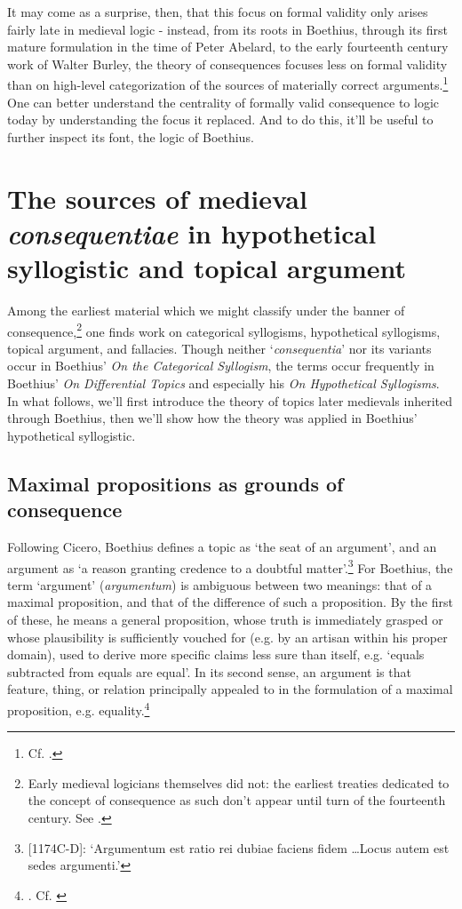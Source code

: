 \documentclass[a4paper, 11pt]{article}
\begin{document}
It may come as a surprise, then, that this focus on formal validity only arises fairly late in medieval logic - instead, from its roots in Boethius, through its first mature formulation in the time of Peter Abelard, to the early fourteenth century work of Walter Burley, the theory of consequences focuses less on formal validity than on high-level categorization of the sources of materially correct arguments.\footnote{Cf.  \autocite{Martin2004,Martin2018,Archambault2018a}.} One can better understand the centrality of formally valid consequence to logic today by understanding the focus it replaced. And to do this, it'll be useful to further inspect its font, the logic of Boethius.

\section{The sources of medieval \emph{consequentiae} in hypothetical syllogistic and topical argument}
Among the earliest material which we might classify under the banner of consequence,\footnote{Early medieval logicians themselves did not: the earliest treaties dedicated to the concept of consequence as such don't appear until turn of the fourteenth century. See \autocite{Archambault2017d}.} one finds work on categorical syllogisms, hypothetical syllogisms, topical argument, and fallacies. Though neither `\emph{consequentia}' nor its variants occur in Boethius' \textit{On the Categorical Syllogism}, the terms occur frequently in Boethius' \emph{On Differential Topics} and especially his \emph{On Hypothetical Syllogisms}. In what follows, we'll first introduce the theory of topics later medievals inherited through Boethius, then we'll show how the theory was applied in Boethius' hypothetical syllogistic.

\subsection{Maximal propositions as grounds of consequence}
Following Cicero, Boethius defines a topic as `the seat of an argument', and an argument as `a reason granting credence to a doubtful matter'.\footnote{[1174C-D]\autocite{BDT}: `Argumentum est ratio rei dubiae faciens fidem \ldots Locus autem est sedes argumenti.'} For Boethius, the term `argument' (\emph{argumentum}) is ambiguous between two meanings: that of a maximal proposition, and that of the difference of such a proposition. By the first of these, he means a general proposition, whose truth is immediately grasped or whose plausibility is sufficiently vouched for (e.g. by an artisan within his proper domain), used to derive more specific claims less sure than itself, e.g. `equals subtracted from equals are equal'. In its second sense, an argument is that feature, thing, or relation principally appealed to in the formulation of a maximal proposition, e.g. equality.\footnote{\autocite[1185A-B]{BDT}. Cf. \autocite{Holopainen2007,Archambault2017e}} 
\end{document}
